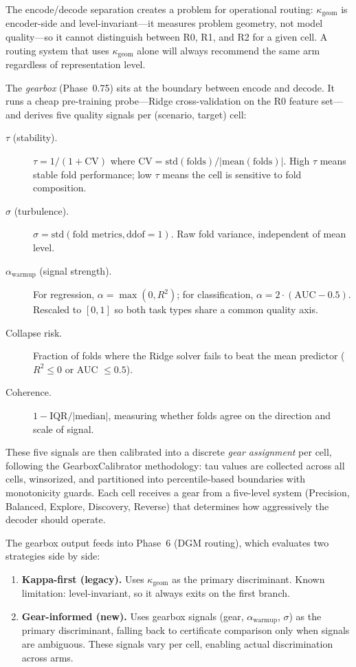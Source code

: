 The encode/decode separation creates a problem for operational routing:
$\kappa_\text{geom}$ is encoder-side and level-invariant---it measures
problem geometry, not model quality---so it cannot distinguish between
R0, R1, and R2 for a given cell. A routing system that uses
$\kappa_\text{geom}$ alone will always recommend the same arm regardless
of representation level.

The \emph{gearbox} (Phase~0.75) sits at the boundary between encode and
decode. It runs a cheap pre-training probe---Ridge cross-validation on
the R0 feature set---and derives five quality signals per
(scenario, target) cell:

\begin{description}
\item[$\tau$ (stability).] $\tau = 1/(1 + \text{CV})$ where
  $\text{CV} = \text{std}(\text{folds}) / |\text{mean}(\text{folds})|$.
  High $\tau$ means stable fold performance; low $\tau$ means the cell
  is sensitive to fold composition.
\item[$\sigma$ (turbulence).] $\sigma = \text{std}(\text{fold metrics},
  \text{ddof}{=}1)$. Raw fold variance, independent of mean level.
\item[$\alpha_\text{warmup}$ (signal strength).] For regression,
  $\alpha = \max(0, R^2)$; for classification,
  $\alpha = 2 \cdot (\text{AUC} - 0.5)$. Rescaled to $[0,1]$ so both
  task types share a common quality axis.
\item[Collapse risk.] Fraction of folds where the Ridge solver fails to
  beat the mean predictor ($R^2 \leq 0$ or AUC $\leq 0.5$).
\item[Coherence.] $1 - \text{IQR} / |\text{median}|$, measuring
  whether folds agree on the direction and scale of signal.
\end{description}

These five signals are then calibrated into a discrete \emph{gear
assignment} per cell, following the GearboxCalibrator methodology: tau
values are collected across all cells, winsorized, and partitioned into
percentile-based boundaries with monotonicity guards. Each cell receives
a gear from a five-level system (Precision, Balanced, Explore, Discovery,
Reverse) that determines how aggressively the decoder should operate.

The gearbox output feeds into Phase~6 (DGM routing), which evaluates
two strategies side by side:
\begin{enumerate}
\item \textbf{Kappa-first (legacy).} Uses $\kappa_\text{geom}$ as the
  primary discriminant. Known limitation: level-invariant, so it always
  exits on the first branch.
\item \textbf{Gear-informed (new).} Uses gearbox signals (gear,
  $\alpha_\text{warmup}$, $\sigma$) as the primary discriminant, falling
  back to certificate comparison only when signals are ambiguous. These
  signals vary per cell, enabling actual discrimination across arms.
\end{enumerate}


